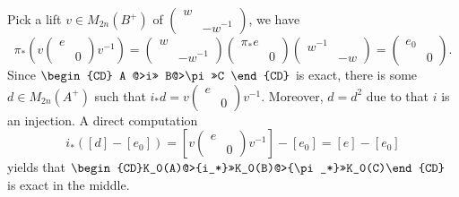 \documentclass[
]{article}
\begin{document}
Pick a lift \(v\in M_{2n}(B^+)\) of
\(\begin{pmatrix}w& \\ & -w^{-1}\end{pmatrix}\), we have
\[\pi_*(v\begin{pmatrix}e & \\ & 0\end{pmatrix}v^{-1})
=\begin{pmatrix}w& \\ & -w^{-1}\end{pmatrix}
\begin{pmatrix}\pi_*e& \\ & 0\end{pmatrix}
\begin{pmatrix}w^{-1}& \\ & -w\end{pmatrix}
=\begin{pmatrix}e_0& \\ & 0\end{pmatrix}.\] Since
\(\begin{CD}  A @>i>> B@>\pi>>C \end{CD}\) is exact, there is some
\(d\in M_{2n}(A^+)\) such that
\(i_* d=v\begin{pmatrix}e & \\ & 0\end{pmatrix}v^{-1}.\) Moreover,
\(d=d^2\) due to that \(i\) is an injection. A direct computation
\[i_*([d]-[e_0])=[v\begin{pmatrix}e & \\ & 0\end{pmatrix}v^{-1}]-[e_0]=[e]-[e_0]\]
yields that \(\begin{CD}K_0(A)@>{i_*}>>K_0(B)@>{\pi_*}>>K_0(C)\end{CD}\)
is exact in the middle.
\end{document}
